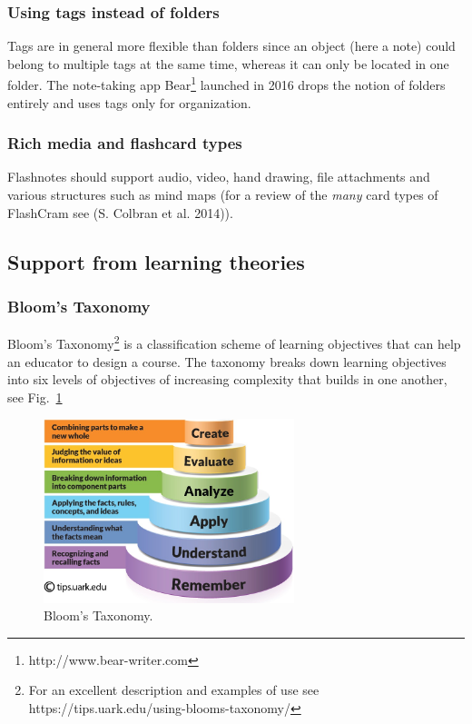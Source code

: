 \subsubsection{Using tags instead of
folders}\label{using-tags-instead-of-folders}

Tags are in general more flexible than folders since an object (here a
note) could belong to multiple tags at the same time, whereas it can
only be located in one folder. The note-taking app Bear\footnote{http://www.bear-writer.com}
launched in 2016 drops the notion of folders entirely and uses tags only
for organization.

\subsubsection{Rich media and flashcard
types}\label{rich-media-and-flashcard-types}

Flashnotes should support audio, video, hand drawing, file attachments
and various structures such as mind maps (for a review of the
\emph{many} card types of FlashCram see (S. Colbran et al. 2014)).

\subsection{Support from learning
theories}\label{support-from-learning-theories}

\subsubsection{Bloom's Taxonomy}\label{blooms-taxonomy}

Bloom's Taxonomy\footnote{For an excellent description and examples of
  use see https://tips.uark.edu/using-blooms-taxonomy/} is a
classification scheme of learning objectives that can help an educator
to design a course. The taxonomy breaks down learning objectives into
six levels of objectives of increasing complexity that builds in one
another, see Fig.~\ref{fig:bloom}

\begin{figure}
\centering
\includegraphics[width=0.65000\textwidth]{assets/Blooms_Taxonomy_pyramid_cake-style-use-with-permission.jpg}
\caption[Bloom's Taxonomy.]{Bloom's
Taxonomy\footnotemark{}.}\label{fig:bloom}
\end{figure}

